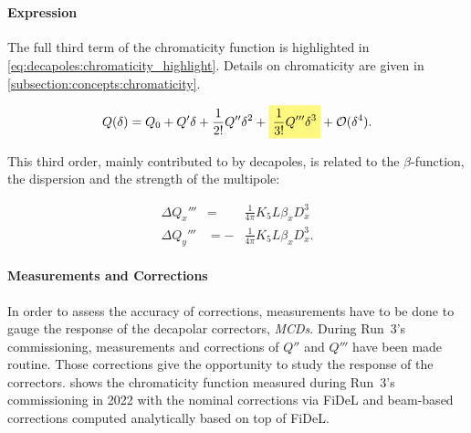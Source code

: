 \section{}

\paragraph{Expression}

The full third term of the chromaticity function is highlighted in
\cref{eq:decapoles:chromaticity_highlight}. Details on chromaticity are given
in \cref{subsection:concepts:chromaticity}.

\begin{equation} 
    Q (\delta) = Q_0 + Q' \delta + \frac{1}{2!} Q'' \delta^2 
                     + \colorbox{yellow!50}{$\displaystyle  \frac{1}{3!}  Q''' \delta^3$}
                     + \mathcal{O}(\delta^4).
    \label{eq:decapoles:chromaticity_highlight}
\end{equation}

This third order, mainly contributed to by decapoles, is related to the $\beta$-function, the
dispersion and the strength of the multipole:

\begin{equation}
    \begin{aligned}
        \Delta Q_x''' &=  &\frac{1}{4\pi} K_{5} L \beta_x D_x^{3}\\
        \Delta Q_y''' &= -&\frac{1}{4\pi} K_{5} L \beta_x D_x^{3}.
    \end{aligned}
\end{equation}


\paragraph{Measurements and Corrections}

In order to assess the accuracy of corrections, measurements have to be done to gauge the response
of the decapolar correctors, \textit{MCDs}.
During Run~3's commissioning, measurements and corrections of $Q''$ and $Q'''$ have been made
routine. Those corrections give the opportunity to study the response of the correctors.
 shows the chromaticity function measured during
Run~3's commissioning in 2022 with the nominal corrections via FiDeL and beam-based corrections
computed analytically based on top of FiDeL.


